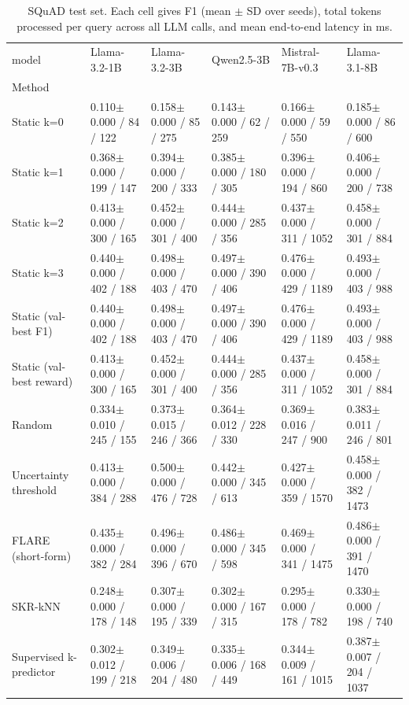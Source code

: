 \begin{table}
\caption{SQuAD test set. Each cell gives F1 (mean $\pm$ SD over seeds), total tokens processed per query across all LLM calls, and mean end-to-end latency in ms.}
\label{tab:main_squad}
\begin{tabular}{llllll}
\toprule
model & Llama-3.2-1B & Llama-3.2-3B & Qwen2.5-3B & Mistral-7B-v0.3 & Llama-3.1-8B \\
Method &  &  &  &  &  \\
\midrule
Static k=0 & 0.110$\pm$0.000 / 84 / 122 & 0.158$\pm$0.000 / 85 / 275 & 0.143$\pm$0.000 / 62 / 259 & 0.166$\pm$0.000 / 59 / 550 & 0.185$\pm$0.000 / 86 / 600 \\
Static k=1 & 0.368$\pm$0.000 / 199 / 147 & 0.394$\pm$0.000 / 200 / 333 & 0.385$\pm$0.000 / 180 / 305 & 0.396$\pm$0.000 / 194 / 860 & 0.406$\pm$0.000 / 200 / 738 \\
Static k=2 & 0.413$\pm$0.000 / 300 / 165 & 0.452$\pm$0.000 / 301 / 400 & 0.444$\pm$0.000 / 285 / 356 & 0.437$\pm$0.000 / 311 / 1052 & 0.458$\pm$0.000 / 301 / 884 \\
Static k=3 & 0.440$\pm$0.000 / 402 / 188 & 0.498$\pm$0.000 / 403 / 470 & 0.497$\pm$0.000 / 390 / 406 & 0.476$\pm$0.000 / 429 / 1189 & 0.493$\pm$0.000 / 403 / 988 \\
Static (val-best F1) & 0.440$\pm$0.000 / 402 / 188 & 0.498$\pm$0.000 / 403 / 470 & 0.497$\pm$0.000 / 390 / 406 & 0.476$\pm$0.000 / 429 / 1189 & 0.493$\pm$0.000 / 403 / 988 \\
Static (val-best reward) & 0.413$\pm$0.000 / 300 / 165 & 0.452$\pm$0.000 / 301 / 400 & 0.444$\pm$0.000 / 285 / 356 & 0.437$\pm$0.000 / 311 / 1052 & 0.458$\pm$0.000 / 301 / 884 \\
Random & 0.334$\pm$0.010 / 245 / 155 & 0.373$\pm$0.015 / 246 / 366 & 0.364$\pm$0.012 / 228 / 330 & 0.369$\pm$0.016 / 247 / 900 & 0.383$\pm$0.011 / 246 / 801 \\
Uncertainty threshold & 0.413$\pm$0.000 / 384 / 288 & 0.500$\pm$0.000 / 476 / 728 & 0.442$\pm$0.000 / 345 / 613 & 0.427$\pm$0.000 / 359 / 1570 & 0.458$\pm$0.000 / 382 / 1473 \\
FLARE (short-form) & 0.435$\pm$0.000 / 382 / 284 & 0.496$\pm$0.000 / 396 / 670 & 0.486$\pm$0.000 / 345 / 598 & 0.469$\pm$0.000 / 341 / 1475 & 0.486$\pm$0.000 / 391 / 1470 \\
SKR-kNN & 0.248$\pm$0.000 / 178 / 148 & 0.307$\pm$0.000 / 195 / 339 & 0.302$\pm$0.000 / 167 / 315 & 0.295$\pm$0.000 / 178 / 782 & 0.330$\pm$0.000 / 198 / 740 \\
Supervised k-predictor & 0.302$\pm$0.012 / 199 / 218 & 0.349$\pm$0.006 / 204 / 480 & 0.335$\pm$0.006 / 168 / 449 & 0.344$\pm$0.009 / 161 / 1015 & 0.387$\pm$0.007 / 204 / 1037 \\

\end{tabular}
\end{table}
